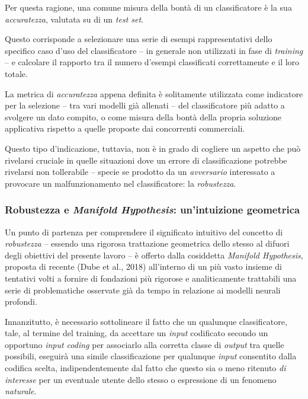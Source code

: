 \documentclass[a4paper, twoside]{article}
\begin{document}
Per questa ragione, una comune misura della bontà di un classificatore è la sua \textit{accuratezza}, valutata su di un \textit{test set}.

Questo corrisponde a selezionare una serie di esempi rappresentativi dello specifico caso d'uso del classificatore -- in generale non utilizzati in fase di \textit{training} -- e calcolare il rapporto tra il numero d'esempi classificati correttamente e il loro totale.

La metrica di \textit{accuratezza} appena definita è solitamente utilizzata come indicatore per la selezione -- tra vari modelli già allenati -- del classificatore più adatto a svolgere un dato compito, o come misura della bontà della propria soluzione applicativa rispetto a quelle proposte dai concorrenti commerciali.

Questo tipo d'indicazione, tuttavia, non è in grado di cogliere un aspetto che può rivelarsi cruciale in quelle situazioni dove un errore di classificazione potrebbe rivelarsi non tollerabile -- specie se prodotto da un \textit{avversario} interessato a provocare un malfunzionamento nel classificatore: la \textit{robustezza}.


\subsubsection{Robustezza e \textit{Manifold Hypothesis}: un'intuizione geometrica}

Un punto di partenza per comprendere il significato intuitivo del concetto di \textit{robustezza} -- essendo una rigorosa trattazione geometrica dello stesso al difuori degli obiettivi del presente lavoro -- è offerto dalla cosiddetta \textit{Manifold Hypothesis}, proposta di recente (Dube et al., 2018) all'interno di un più vasto insieme di tentativi volti a fornire di fondazioni più rigorose e analiticamente trattabili una serie di problematiche osservate già da tempo in relazione ai modelli neurali profondi.

Innanzitutto, è necessario sottolineare il fatto che un qualunque classificatore, tale, al termine del training, da accettare un \textit{input} codificato secondo un opportuno \textit{input coding} per associarlo alla corretta classe di \textit{output} tra quelle possibili, eseguirà una simile classificazione per qualunque \textit{input} consentito dalla codifica scelta, indipendentemente dal fatto che questo sia o meno ritenuto \textit{di interesse} per un eventuale utente dello stesso o espressione di un fenomeno \textit{naturale}.
\end{document}
